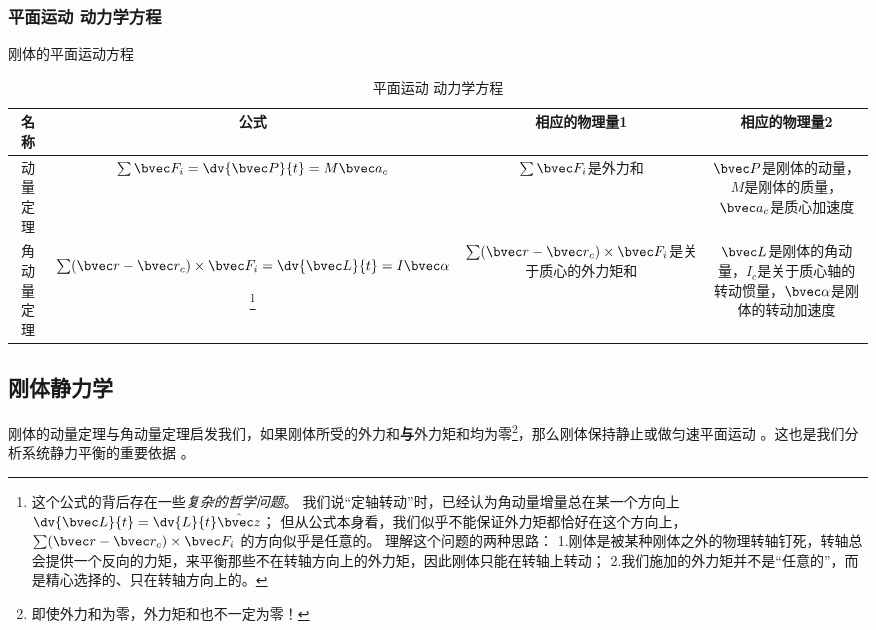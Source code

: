 \subsubsection{平面运动 动力学方程}
刚体的平面运动方程
\begin{table}[ht]
\centering
\caption{平面运动 动力学方程}\label{RGAB_tab1}
\begin{tabular}{|c|c|c|c|}
\hline
名称 & 公式 & 相应的物理量1 & 相应的物理量2 \\
\hline
动量定理 & $\sum \bvec F_i = \dv{\bvec P}{t} = M \bvec a_c$ & $\sum \bvec F_i$是外力和 & $\bvec P$是刚体的动量，$M$是刚体的质量，$\bvec a_c$是质心加速度 \\
\hline
角动量定理 & $\sum (\bvec r - \bvec r_c) \times \bvec F_i = \dv{\bvec L}{t} = I \bvec \alpha$ 

\footnote{
这个公式的背后存在一些\textsl{复杂的哲学问题}。
我们说“定轴转动”时，已经认为角动量增量总在某一个方向上$\dv{\bvec L}{t} = \dv{L}{t} \hat{\bvec z}$；
但从公式本身看，我们似乎不能保证外力矩都恰好在这个方向上，$\sum (\bvec r - \bvec r_c) \times \bvec F_i$ 的方向似乎是任意的。
理解这个问题的两种思路：
1.刚体是被某种刚体之外的物理转轴钉死，转轴总会提供一个反向的力矩，来平衡那些不在转轴方向上的外力矩，因此刚体只能在转轴上转动；
2.我们施加的外力矩并不是“任意的”，而是精心选择的、只在转轴方向上的。
} 

& $\sum (\bvec r - \bvec r_c)\times \bvec F_i$是关于质心的外力矩和 & $\bvec L$是刚体的角动量，$I_c$是关于质心轴的转动惯量，$\bvec \alpha$是刚体的转动加速度 \\
\hline
\end{tabular}
\end{table}

\subsection{刚体静力学}
刚体的动量定理与角动量定理启发我们，如果刚体所受的外力和\textbf{与}外力矩和均为零\footnote{即使外力和为零，外力矩和也不一定为零！}，那么刚体保持静止或做匀速平面运动 。这也是我们分析系统静力平衡的重要依据 。



